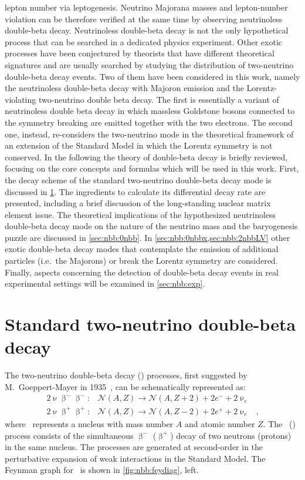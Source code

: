 lepton number via leptogenesis. Neutrino Majorana masses and lepton-number violation can
be therefore verified at the same time by observing neutrinoless double-beta decay.
\newpar
Neutrinoless double-beta decay is not the only hypothetical process that can be searched
in a dedicated physics experiment. Other exotic processes have been conjectured by
theorists that have different theoretical signatures and are usually searched by studying
the distribution of two-neutrino double-beta decay events. Two of them have been
considered in this work, namely the neutrinoless double-beta decay with Majoron emission
and the Lorentz-violating two-neutrino double beta decay. The first is essentially a
variant of neutrinoless double beta decay in which massless Goldstone bosons connected to
the symmetry breaking are emitted together with the two electrons. The second one,
instead, re-considers the two-neutrino mode in the theoretical framework of an extension
of the Standard Model in which the Lorentz symmetry is not conserved.
\newpar
In the following the theory of double-beta decay is briefly reviewed, focusing on the core
concepts and formulas which will be used in this work. First, the decay scheme of the
standard two-neutrino double-beta decay mode is discussed in \cref{sec:nbb:2nbb}. The
ingredients to calculate its differential decay rate are presented, including a brief
discussion of the long-standing nuclear matrix element issue. The theoretical implications
of the hypothesized neutrinoless double-beta decay mode on the nature of the neutrino mass
and the baryogenesis puzzle are discussed in \cref{sec:nbb:0nbb}. In
\cref{sec:nbb:0nbbx,sec:nbb:2nbbLV} other exotic double-beta decay modes that contemplate
the emission of additional particles (i.e.~the Majorons) or break the Lorentz symmetry
are considered. Finally, aspects concerning the detection of double-beta decay events in
real experimental settings will be examined in \cref{sec:nbb:exp}.

\section{Standard two-neutrino double-beta decay}%
\label{sec:nbb:2nbb}

The two-neutrino double-beta decay (\nnbb) processes, first suggested by M.~Goeppert-Mayer
in 1935~\cite{GoeppertMayer1935}, can be schematically represented as:
\[
  \begin{array}{llr}
    2\upnu\upbeta^-\upbeta^-: &
      \mathcal{N}(A,Z) \longrightarrow \mathcal{N}(A,Z+2)+2e^-+2{\overline \upnu}_e & \\
    2\upnu\upbeta^+\upbeta^+: &
      \mathcal{N}(A,Z) \longrightarrow \mathcal{N}(A,Z-2)+2e^++2\upnu_e &,
  \end{array}
\]
where \NAZ\ represents a nucleus with mass number $A$ and atomic number $Z$. The \nnbbm\
(\nnbbp) process consists of the simultaneous $\upbeta^-$ ($\upbeta^+$) decay of two
neutrons (protons) in the same nucleus. The processes are generated at second-order in the
perturbative expansion of weak interactions in the Standard Model. The Feynman graph for
\nnbbm\ is shown in \cref{fig:nbb:feydiag}, left.

